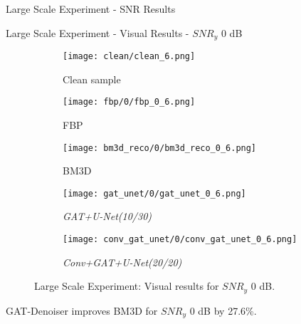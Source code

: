 \begin{frame}{Large Scale Experiment - SNR Results}
    
\end{frame}

\begin{frame}{Large Scale Experiment - Visual Results - $SNR_y$ 0 dB}
\begin{figure}
    \captionsetup[subfigure]{justification=centering}
    \centering
    \begin{subfigure}[t]{0.18\textwidth}
      \texttt{[image: clean/clean\_6.png]}
      \caption{Clean sample}
    \end{subfigure} \hfill
    \begin{subfigure}[t]{0.18\textwidth}
      \texttt{[image: fbp/0/fbp\_0\_6.png]}
      \caption{FBP}
    \end{subfigure} \hfill
    \begin{subfigure}[t]{0.18\textwidth}
      \texttt{[image: bm3d\_reco/0/bm3d\_reco\_0\_6.png]}
      \caption{BM3D}
    \end{subfigure} \hfill
    \begin{subfigure}[t]{0.18\textwidth}
      \texttt{[image: gat\_unet/0/gat\_unet\_0\_6.png]}
      \caption{\textit{GAT+U-Net(10/30)}}
    \end{subfigure} \hfill
    \begin{subfigure}[t]{0.18\textwidth}
      \texttt{[image: conv\_gat\_unet/0/conv\_gat\_unet\_0\_6.png]}
      \caption{\textit{Conv+GAT+U-Net(20/20)}}
    \end{subfigure} \hfill
    \caption{Large Scale Experiment: Visual results for $SNR_y$ 0 dB.}
  \end{figure}
  

  \begin{tcolorbox}[colback=red!5!white, colframe=red!75!black]
    GAT-Denoiser improves BM3D for $SNR_y$ 0 dB  by 27.6\%.
    \end{tcolorbox}
    
\end{frame}


